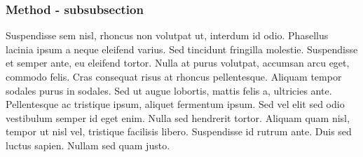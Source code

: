 \subsubsection{Method - subsubsection}
Suspendisse sem nisl, rhoncus non volutpat ut, interdum id odio. Phasellus
lacinia ipsum a neque eleifend varius. Sed tincidunt fringilla molestie.
Suspendisse et semper ante, eu eleifend tortor. Nulla at purus volutpat,
accumsan arcu eget, commodo felis. Cras consequat risus at rhoncus
pellentesque. Aliquam tempor sodales purus in sodales. Sed ut augue lobortis,
mattis felis a, ultricies ante. Pellentesque ac tristique ipsum, aliquet
fermentum ipsum. Sed vel elit sed odio vestibulum semper id eget enim. Nulla
sed hendrerit tortor. Aliquam quam nisl, tempor ut nisl vel, tristique
facilisis libero. Suspendisse id rutrum ante. Duis sed luctus sapien. Nullam
sed quam justo.
